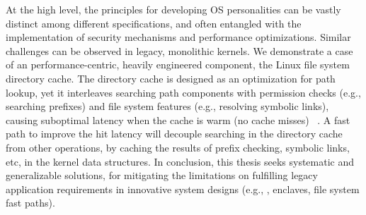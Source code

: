 At the high level,
the principles for developing OS personalities can be vastly distinct
among different specifications,
and often entangled with
the implementation of
security mechanisms and performance optimizations.
Similar challenges can be observed in legacy, monolithic kernels.
We demonstrate a case of an performance-centric, heavily engineered component,
the Linux file system directory cache.
The directory cache is designed as an optimization for path lookup,
yet it interleaves searching path components
with permission checks (e.g., searching prefixes)
and file system features (e.g., resolving symbolic links),
causing suboptimal latency when the cache is warm (no cache misses)
~\cite{tsai15dcache}.
A fast path to improve the hit latency
will decouple searching in the directory cache
from other operations,
by %
caching the results of prefix checking, symbolic links, etc, in the kernel data structures.
In conclusion, this thesis seeks systematic and generalizable solutions,
for mitigating the limitations on
fulfilling legacy application requirements
in innovative system designs (e.g., \liboses{}, enclaves, file system fast paths).



